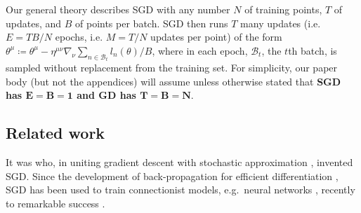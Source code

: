 \documentclass{article}
\theoremstyle{plain}
\theoremstyle{definition}
\newcommand{\Bb}{\mathcal{B}}
\begin{document}

        Our general theory describes SGD with any number
             $N$ of training points,
             $T$ of updates, and 
             $B$ of points per batch.
        SGD then runs $T$ many updates (i.e. $E=TB/N$ epochs, i.e. $M=T/N$
        updates per point) of the form
        $
            \theta^\mu
            \coloneqq
            \theta^\mu -
            \eta^{\mu\nu} \nabla_\nu
                \sum_{n\in \Bb_t} l_n(\theta) / B
        $,
        where in each epoch, $\Bb_t$, the $t$th batch, is sampled without
        replacement from the training set.
        For simplicity, our paper body (but not the appendices) will assume
        unless otherwise stated that \textbf{SGD has $\mathbf{E=B=1}$ and GD
        has $\mathbf{T=B=N}$}.


\subsection{Related work} \label{sect:related}

    It was \cite{ki52} who, in uniting gradient descent \citep{ca47} with
    stochastic approximation \citep{ro51}, invented SGD.  Since the development
    of back-propagation for efficient differentiation \citep{we74}, SGD has
    been used to train connectionist models, e.g.\ neural networks
    \citep{bo91}, recently to remarkable success \citep{le15}.

\end{document}
